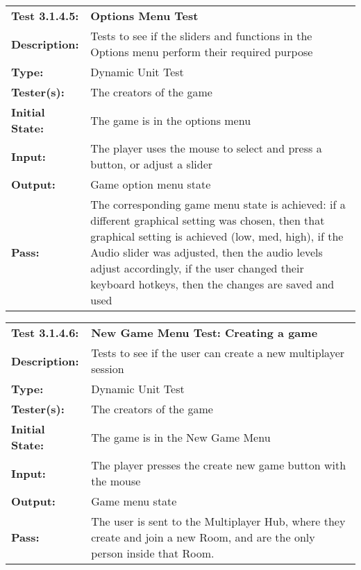 \documentclass[12pt, titlepage]{article}
\begin{document}
\begin{mdframed}[linewidth=1pt]
\begin{tabularx}{\textwidth}{@{}p{3cm}X@{}}
{\bf Test 3.1.4.5:} & {\bf Options Menu Test}\\[\baselineskip]
{\bf Description:} & Tests to see if the sliders and functions in the Options menu perform their required purpose\\[0.5\baselineskip]
{\bf Type:} & Dynamic Unit Test\\[0.5\baselineskip]
{\bf Tester(s):} & The creators of the game\\[0.5\baselineskip]
{\bf Initial State:} & The game is in the options menu\\[0.5\baselineskip]
{\bf Input:} & The player uses the mouse to select and press a button, or adjust a slider \\[0.5\baselineskip]
{\bf Output:} & Game option menu state\\[0.5\baselineskip]
{\bf Pass:} & The corresponding game menu state is achieved: if a different graphical setting was chosen, then that graphical setting is achieved (low, med, high), if the Audio slider was adjusted, then the audio levels adjust accordingly, if the user changed their keyboard hotkeys, then the changes are saved and used
\end{tabularx}
\end{mdframed}

\begin{mdframed}[linewidth=1pt]
\begin{tabularx}{\textwidth}{@{}p{3cm}X@{}}
{\bf Test 3.1.4.6:} & {\bf New Game Menu Test: Creating a game}\\[\baselineskip]
{\bf Description:} & Tests to see if the user can create a new multiplayer session\\[0.5\baselineskip]
{\bf Type:} & Dynamic Unit Test\\[0.5\baselineskip]
{\bf Tester(s):} & The creators of the game\\[0.5\baselineskip]
{\bf Initial State:} & The game is in the New Game Menu\\[0.5\baselineskip]
{\bf Input:} & The player presses the create new game button with the mouse \\[0.5\baselineskip]
{\bf Output:} & Game menu state\\[0.5\baselineskip]
{\bf Pass:} & The user is sent to the Multiplayer Hub, where they create and join a new Room, and are the only person inside that Room.
\end{tabularx}
\end{mdframed}
\end{document}
